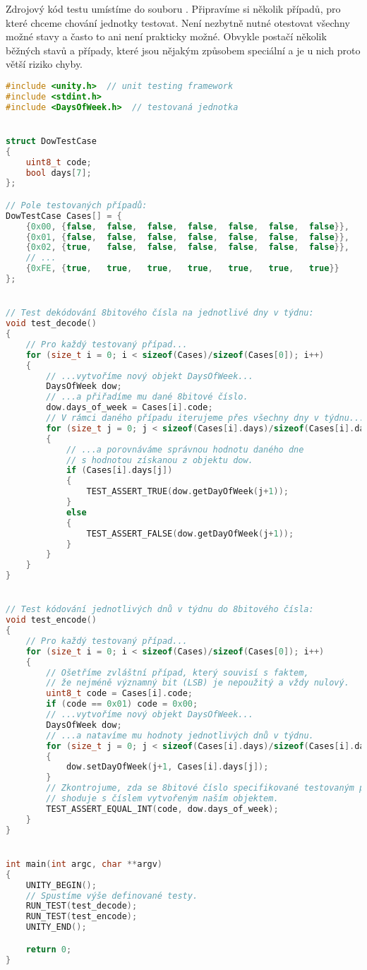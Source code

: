 Zdrojový kód testu umístíme do souboru
. Připravíme si několik
případů, pro které chceme chování jednotky testovat. Není nezbytně nutné
otestovat všechny možné stavy a často to ani není prakticky možné. Obvykle
postačí několik běžných stavů a případy, které jsou nějakým způsobem speciální
a je u nich proto větší riziko chyby.
\begin{lstlisting}[language=C++,style=numbers,breakatwhitespace=true]
#include <unity.h>  // unit testing framework
#include <stdint.h>
#include <DaysOfWeek.h>  // testovaná jednotka


struct DowTestCase
{
    uint8_t code;
    bool days[7];
};

// Pole testovaných případů:
DowTestCase Cases[] = {
    {0x00, {false,  false,  false,  false,  false,  false,  false}},
    {0x01, {false,  false,  false,  false,  false,  false,  false}},
    {0x02, {true,   false,  false,  false,  false,  false,  false}},
    // ...
    {0xFE, {true,   true,   true,   true,   true,   true,   true}}
};


// Test dekódování 8bitového čísla na jednotlivé dny v týdnu:
void test_decode()
{
    // Pro každý testovaný případ...
    for (size_t i = 0; i < sizeof(Cases)/sizeof(Cases[0]); i++)
    {
        // ...vytvoříme nový objekt DaysOfWeek...
        DaysOfWeek dow;
        // ...a přiřadíme mu dané 8bitové číslo.
        dow.days_of_week = Cases[i].code;
        // V rámci daného případu iterujeme přes všechny dny v týdnu...
        for (size_t j = 0; j < sizeof(Cases[i].days)/sizeof(Cases[i].days[0]); j++)
        {
            // ...a porovnáváme správnou hodnotu daného dne
            // s hodnotou získanou z objektu dow.
            if (Cases[i].days[j])
            {
                TEST_ASSERT_TRUE(dow.getDayOfWeek(j+1));
            }
            else
            {
                TEST_ASSERT_FALSE(dow.getDayOfWeek(j+1));
            }
        }
    }
}


// Test kódování jednotlivých dnů v týdnu do 8bitového čísla:
void test_encode()
{
    // Pro každý testovaný případ...
    for (size_t i = 0; i < sizeof(Cases)/sizeof(Cases[0]); i++)
    {
        // Ošetříme zvláštní případ, který souvisí s faktem,
        // že nejméně významný bit (LSB) je nepoužitý a vždy nulový.
        uint8_t code = Cases[i].code;
        if (code == 0x01) code = 0x00;
        // ...vytvoříme nový objekt DaysOfWeek...
        DaysOfWeek dow;
        // ...a natavíme mu hodnoty jednotlivých dnů v týdnu.
        for (size_t j = 0; j < sizeof(Cases[i].days)/sizeof(Cases[i].days[0]); j++)
        {
            dow.setDayOfWeek(j+1, Cases[i].days[j]);
        }
        // Zkontrojume, zda se 8bitové číslo specifikované testovaným případem
        // shoduje s číslem vytvořeným naším objektem.
        TEST_ASSERT_EQUAL_INT(code, dow.days_of_week);
    }
}


int main(int argc, char **argv)
{
    UNITY_BEGIN();
    // Spustíme výše definované testy.
    RUN_TEST(test_decode);
    RUN_TEST(test_encode);
    UNITY_END();

    return 0;
}
\end{lstlisting}

